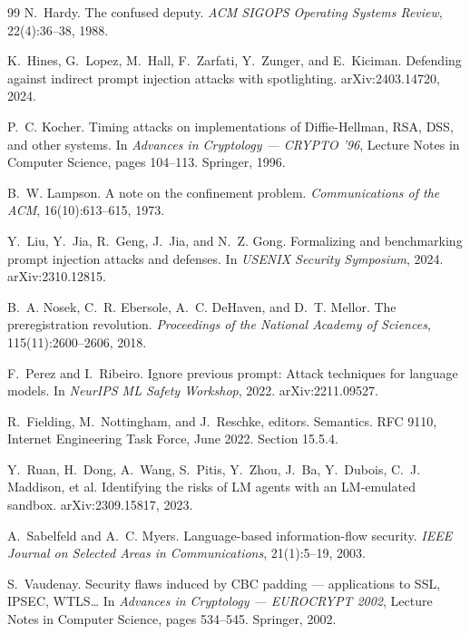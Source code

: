 \documentclass[12pt,oneside]{report}
\begin{document}
\begin{thebibliography}{99}
N.~Hardy.
\newblock The confused deputy.
\newblock \emph{ACM SIGOPS Operating Systems Review}, 22(4):36--38, 1988.

K.~Hines, G.~Lopez, M.~Hall, F.~Zarfati, Y.~Zunger, and E.~Kiciman.
\newblock Defending against indirect prompt injection attacks with
  spotlighting.
\newblock arXiv:2403.14720, 2024.

P.~C. Kocher.
\newblock Timing attacks on implementations of {Diffie-Hellman}, {RSA}, {DSS},
  and other systems.
\newblock In \emph{Advances in Cryptology --- CRYPTO '96}, Lecture Notes in
  Computer Science, pages 104--113. Springer, 1996.

B.~W. Lampson.
\newblock A note on the confinement problem.
\newblock \emph{Communications of the ACM}, 16(10):613--615, 1973.

Y.~Liu, Y.~Jia, R.~Geng, J.~Jia, and N.~Z. Gong.
\newblock Formalizing and benchmarking prompt injection attacks and defenses.
\newblock In \emph{USENIX Security Symposium}, 2024. arXiv:2310.12815.

B.~A. Nosek, C.~R. Ebersole, A.~C. DeHaven, and D.~T. Mellor.
\newblock The preregistration revolution.
\newblock \emph{Proceedings of the National Academy of Sciences},
  115(11):2600--2606, 2018.

F.~Perez and I.~Ribeiro.
\newblock Ignore previous prompt: Attack techniques for language models.
\newblock In \emph{NeurIPS ML Safety Workshop}, 2022. arXiv:2211.09527.

R.~Fielding, M.~Nottingham, and J.~Reschke, editors.
 Semantics.
\newblock RFC 9110, Internet Engineering Task Force, June 2022.
\newblock Section 15.5.4.

Y.~Ruan, H.~Dong, A.~Wang, S.~Pitis, Y.~Zhou, J.~Ba, Y.~Dubois, C.~J.
  Maddison, et al.
\newblock Identifying the risks of {LM} agents with an {LM}-emulated sandbox.
\newblock arXiv:2309.15817, 2023.

A.~Sabelfeld and A.~C. Myers.
\newblock Language-based information-flow security.
\newblock \emph{IEEE Journal on Selected Areas in Communications},
  21(1):5--19, 2003.

S.~Vaudenay.
\newblock Security flaws induced by {CBC} padding --- applications to {SSL},
  {IPSEC}, {WTLS}\ldots
\newblock In \emph{Advances in Cryptology --- EUROCRYPT 2002}, Lecture Notes in
  Computer Science, pages 534--545. Springer, 2002.


\end{thebibliography}
\end{document}
